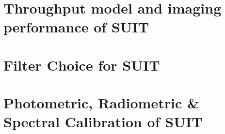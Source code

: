 \section{Throughput model and imaging performance of SUIT}\label{sec:suit_imaging}

\section{Filter Choice for SUIT}\label{sec:filter_choice}

\section{Photometric, Radiometric \& Spectral Calibration of SUIT}\label{sec:suit_cal}

